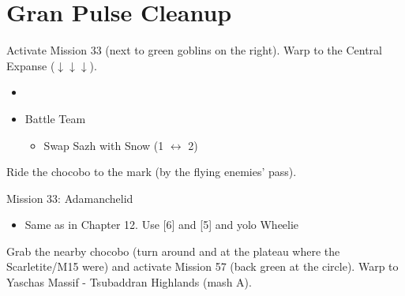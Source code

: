\chapter{Gran Pulse Cleanup}

Activate Mission 33 (next to green goblins on the right).
Warp to the Central Expanse ($\downarrow\downarrow\downarrow$).

\begin{menu}
	\begin{itemize}
	\paradigm
		\begin{itemize}
			\item {}%
				{\paradigmline{\com}{(\com)}{\com}}%
				{\paradigmline{\com}{(\com)}{\sab}}%
				{\paradigmline{(\com)}{\sen}{(\med)}}%
				{\paradigmline{\syn}{\sen}{\med}}%
				{\paradigmline{(\syn)}{(\rav)}{(\sab)}}%
				{\paradigmline[4]{(\rav)}{\rav}{\sab}}%
			\item Battle Team
				\begin{itemize}
					\item Swap Sazh with Snow (1 $\leftrightarrow$ 2)
				\end{itemize}
		\end{itemize}
	\end{itemize}
\end{menu}

\renewcommand{\first}{[1] Cerberus (\com/\com/\com)}
\renewcommand{\second}{[2] Devastation (\com/\com/\sab)}
\renewcommand{\third}{[3] Solidarity (\com/\sen/\med)}
\renewcommand{\fourth}{[4] Protection (\syn/\sen/\med)}
\renewcommand{\fifth}{[5] Guerilla (\syn/\rav/\sab)}
\renewcommand{\sixth}{[6] Smart Bomb (\rav/\rav/\sab)}

Ride the chocobo to the mark (by the flying enemies' pass).

\begin{battle}{Mission 33: Adamanchelid}
	\begin{itemize}
		\item Same as in Chapter 12. Use [6] and [5] and yolo Wheelie
	\end{itemize}
\end{battle}

Grab the nearby chocobo (turn around and at the plateau where the Scarletite/M15 were) and activate Mission 57 (back green at the circle).
Warp to Yaschas Massif - Tsubaddran Highlands (mash A).

